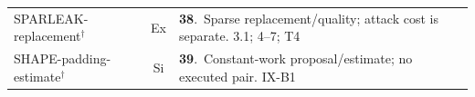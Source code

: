 \begin{table}[p]
\begin{minipage}[t]{0.495\textwidth}
\begin{tabularx}{\linewidth}{@{}p{.36\linewidth}cY@{}}
\textsf{SPARLEAK-replacement}$^{\dagger}$~\cite{chen2026sparleak} & Ex & \textbf{38}.~Sparse replacement/quality; attack cost is separate. 3.1; 4--7; T4\\
\textsf{SHAPE-padding-estimate}$^{\dagger}$~\cite{hadad2026shape} & Si & \textbf{39}.~Constant-work proposal/estimate; no executed pair. IX-B1\\
\bottomrule\end{tabularx}
\end{minipage}
\end{table}
